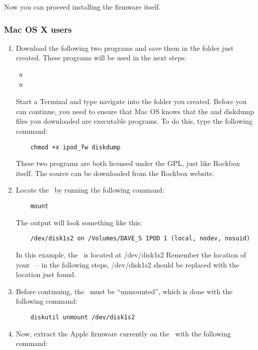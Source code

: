 Now you can proceed installing the firmware itself.

\subsubsection{Mac OS X users}
\begin{enumerate}
  \item Download the following two programs and save them in the folder just
    created. These programs will be used in the next steps:
    \begin{itemize}
      \item {}
      \item {}
    \end{itemize}
    Start a Terminal and type navigate into the folder you created. Before
    you can continue, you need to ensure that Mac OS knows that the
    and diskdump files you downloaded are executable programs. To do this,
    type the following command:
    \begin{verbatim}
    chmod +x ipod_fw diskdump
    \end{verbatim}
    These two programs are both licensed under the GPL, just like Rockbox
    itself. The source can be downloaded from the Rockbox website.
  \item Locate the \dap\ by running the following command:
    \begin{verbatim}
    mount
    \end{verbatim}
    The output will look something like this: 
    \begin{verbatim}
    /dev/disk1s2 on /Volumes/DAVE_S IPOD 1 (local, nodev, nosuid)
    \end{verbatim}
    In this example, the \dap\ is located at /dev/disk1s2 Remember the 
    location of your \dap\  -- in the following steps, /dev/disk1s2 should be
    replaced with the location just found.
  \item Before continuing, the \dap\ must be ``unmounted'', which is
    done with the following command:
    \begin{verbatim}
    diskutil unmount /dev/disk1s2
    \end{verbatim}
  \item Now, extract the Apple firmware currently on the \dap\ with the
    following command:
    \begin{verbatim}

\end{verbatim}
\end{enumerate}
